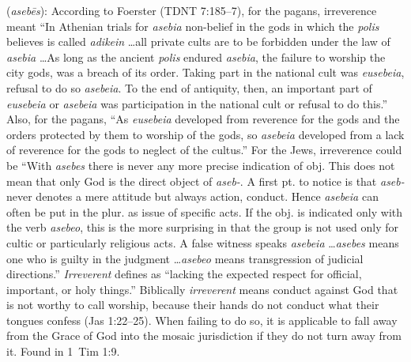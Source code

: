 \item[Irreverent,]

(\textit{asebēs}):
According to Foerster (TDNT 7:185--7), for the pagans, irreverence meant ``In Athenian trials for \emph{asebia} non-belief in the gods in which the \emph{polis} believes is called \emph{adikein} \ldots all private cults are to be forbidden under the law of \emph{asebia} \ldots As long as the ancient \emph{polis} endured \emph{asebia}, the failure to worship the city gods, was a breach of its order. Taking part in the national cult was \emph{eusebeia}, refusal to do so \emph{asebeia}. To the end of antiquity, then, an important part of \emph{eusebeia} or \emph{asebeia} was participation in the national cult or refusal to do this.'' Also, for the pagans, ``As \emph{eusebeia} developed from reverence for the gods and the orders protected by them to worship of the gods, so \emph{asebeia} developed from a lack of reverence for the gods  to neglect of the cultus.'' For the Jews, irreverence could be ``With \emph{asebes} there is never any more precise indication of obj. This does not mean that only God is the direct object of \emph{aseb-}. A first pt. to notice is that \emph{aseb-} never denotes a mere attitude but always action, conduct. Hence \emph{asebeia} can often be put in the plur. as issue of specific acts. If the obj. is indicated only with the verb \emph{asebeo}, this is the more surprising in that the group is not used only for cultic or particularly religious acts. A false witness speaks \emph{asebeia} \ldots \emph{asebes} means one who is guilty in the judgment \ldots \emph{asebeo} means transgression of judicial directions.'' \emph{Irreverent} defines as ``lacking the expected respect for official, important, or holy things.'' Biblically \emph{irreverent} means conduct against God that is not worthy to call worship, because their hands do not conduct what their tongues confess (Jas 1:22--25). When failing to do so, it is applicable to fall away from the Grace of God into the mosaic jurisdiction if they do not turn away from it.
Found in 1~Tim 1:9.
